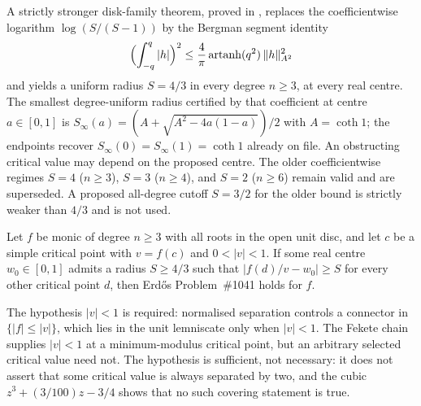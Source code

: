 \documentclass[11pt]{article}
\begin{document}
\begin{corollary}\label{res:critical-value-thresholds}
A strictly stronger disk-family theorem, proved in
, replaces
the coefficientwise logarithm $\log(S/(S-1))$ by the Bergman segment identity
\[
 \Bigl(\int_{-q}^{q}|h|\Bigr)^2
 \le\frac4\pi\operatorname{artanh}(q^2)\,\|h\|_{A^2}^2
\]
and yields a uniform radius $S=4/3$ in every degree $n\ge3$, at every real
centre.  The smallest degree-uniform radius certified by that coefficient at
centre $a\in[0,1]$ is
$S_\infty(a)=(A+\sqrt{A^2-4a(1-a)})/2$ with $A=\coth 1$; the endpoints recover $S_\infty(0)=S_\infty(1)=\coth1$ already on file.
An obstructing critical value may depend on the proposed centre.  The older
coefficientwise regimes $S=4$ ($n\ge3$), $S=3$ ($n\ge4$), and $S=2$ ($n\ge6$)
remain valid and are superseded.  A proposed all-degree cutoff $S=3/2$ for
the older bound is strictly weaker than $4/3$ and is not used.
\end{corollary}

\begin{corollary}\label{res:separation-parent}
Let $f$ be monic of degree $n\ge3$ with all roots in the open unit disc, and
let $c$ be a simple critical point with $v=f(c)$ and $0<|v|<1$.  If some real centre
$w_0\in[0,1]$ admits a radius $S\ge4/3$ such that $|f(d)/v-w_0|\ge S$ for
every other critical point $d$, then Erd\H{o}s Problem~\#1041 holds for $f$.
\end{corollary}

\noindent The hypothesis $|v|<1$ is required: normalised separation controls a
connector in $\{|f|\le|v|\}$, which lies in the unit lemniscate only when
$|v|<1$.  The Fekete chain supplies $|v|<1$ at a minimum-modulus critical
point, but an arbitrary selected critical value need not.
The hypothesis is sufficient, not necessary: it does not assert that some
critical value is always separated by two, and the cubic
$z^3+(3/100)z-3/4$ shows that no such covering statement is true.
\end{document}

